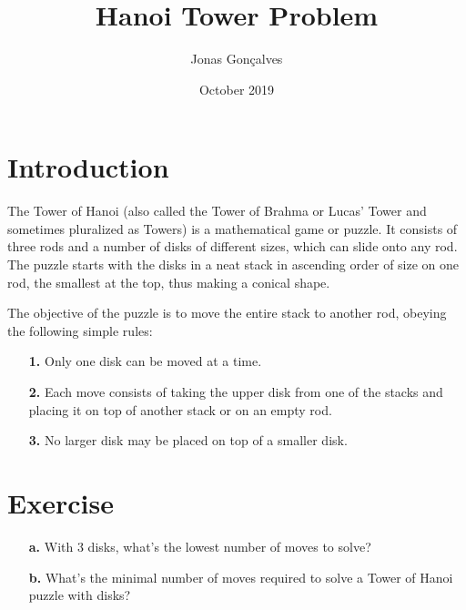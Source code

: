 \documentclass{article}
\title{Hanoi Tower Problem}
\author{Jonas Gonçalves}
\date{October 2019}
\begin{document}
\maketitle

\section{Introduction}
    The Tower of Hanoi (also called the Tower of Brahma or Lucas' Tower and sometimes pluralized as Towers) is a mathematical game or puzzle. It consists of three rods and a number of disks of different sizes, which can slide onto any rod. The puzzle starts with the disks in a neat stack in ascending order of size on one rod, the smallest at the top, thus making a conical shape.

    The objective of the puzzle is to move the entire stack to another rod, obeying the following simple rules:
    
    \begin{itemize}
        \item [\textbf{1.}] Only one disk can be moved at a time.
        \item [\textbf{2.}] Each move consists of taking the upper disk from one of the stacks and placing it on top of another stack or on an empty rod.
        \item [\textbf{3.}] No larger disk may be placed on top of a smaller disk.
    \end{itemize}
\section{Exercise}
    \begin{itemize}
        \item[\textbf{a.}] With 3 disks, what's the lowest number of moves to solve?
        \item[\textbf{b.}] What's the minimal number of moves required to solve a Tower of Hanoi puzzle with disks?
    \end{itemize}
    
\end{document}

